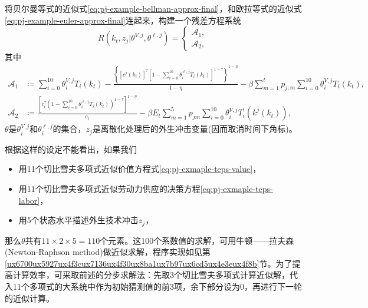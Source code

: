 将贝尔曼等式的近似式\eqref{eq:pj-example-bellman-approx-final}，和欧拉等式的近似式\eqref{eq:pj-example-euler-approx-final}连起来，构建一个残差方程系统
\begin{equation}
  \label{eq:pj-example-residual-approx}
  R\left( k_{t}, z_{j} | \theta^{V,j}, \theta^{\ell, j} \right) =
  \begin{cases}
    \mathcal{A}_{1}, \\
    \mathcal{A}_{2},
  \end{cases}
\end{equation}
其中
\begin{align*}
  \mathcal{A}_{1} & \coloneqq \sum_{i=0}^{10} \theta_{i}^{V,j} T_{i} \left( k_{t} \right)
  - \frac{
  \left\{
  \left[
  c^{j} \left( k_{t} \right)
  \right]^{\tau}
  \left[
  1 - \sum_{i=0}^{10} \theta_{i}^{\ell, j} T_{i} \left( k_{t} \right)
  \right]^{1 - \tau}
  \right\}^{1 - \eta}
  }{1-\eta}
  - \beta \sum_{m=1}^{t} p_{j,m} \sum_{i=0}^{10} \theta_{i}^{V,j} T_{i} \left( k_{t} \right), \\
  \mathcal{A}_{2} & \coloneqq
  \frac{
  \left[
  c_{t}^{\tau}
  \left( 1 -
  \sum_{i=0}^{10} \theta_{i}^{\ell, j} T_{i} \left( k_{t} \right)
  \right)^{1 - \tau}
  \right]^{1-\eta}
  }{
  c_{t}
  }
  - \beta E_{t} \sum_{m=1}^{5} p_{jm}
  \sum_{i=0}^{10} \theta_{i}^{V,j}
  T_{i}^{'} \left( k^{j} \left( k_{t} \right) \right),
\end{align*}
$\theta$是$\theta_{i}^{V,j}$和$ \theta_{i}^{\ell,j}$的集合，$z_{j}$是离散化处理后的外生冲击变量(因而取消时间下角标)。

根据这样的设定不能看出，如果我们
\begin{itemize}
  \item 用11个切比雪夫多项式近似价值方程式\eqref{eq:pj-exmaple-teps-value}，
  \item 用11个切比雪夫多项式近似劳动力供应的决策方程\eqref{eq:pj-exmaple-teps-labor}，
  \item 用5个状态水平描述外生技术冲击$z_{j}$，
\end{itemize}
那么$\theta$共有$11 \times 2 \times 5 = 110$个元素。这100个系数值的求解，可用牛顿——拉夫森(Newton-Raphson method)做近似求解，程序实现如见第\ref{ux6700ux5927ux4f3cux7136ux4f30ux8ba1ux7b97ux6cd5ux4e3eux4f8b}节。为了提高计算效率，可采取前述的分步求解法：先取3个切比雪夫多项式计算近似解，代入11个多项式的大系统中作为初始猜测值的前3项，余下部分设为$0$，再进行下一轮的近似计算。

